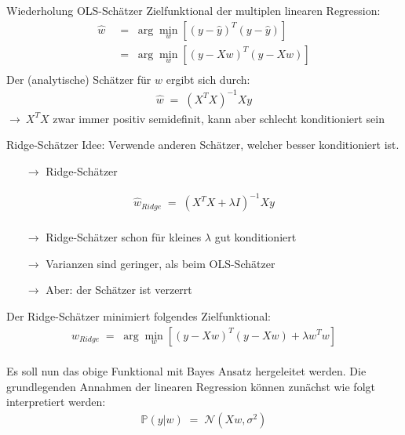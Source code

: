 \documentclass{beamer}
\begin{document}
{\begin{frame}{Wiederholung OLS-Schätzer}
	Zielfunktional der multiplen linearen Regression:
	\begin{align}
		\hat{w}&\;=\;\arg\underset{w}{\min}\left[\left(y-\hat{y}\right)^T\left(y-\hat{y}\right)\right] \\
		&\;=\;\arg\underset{w}{\min}\left[\left(y-Xw\right)^T\left(y-Xw\right)\right]\\
	\end{align}
	Der (analytische) Schätzer für $w$ ergibt sich durch:
	\begin{align}
		\hat{w}\;=\;\left(X^TX\right)^{-1}Xy
	\end{align}
	$\rightarrow\: X^TX$ zwar immer positiv semidefinit, kann aber schlecht konditioniert sein
\end{frame}

\begin{frame}{Ridge-Schätzer}
	Idee: Verwende anderen Schätzer, welcher besser konditioniert ist.
	\begin{itemize}
		\item[$\rightarrow$] Ridge-Schätzer
	\end{itemize}
	\begin{align}
		\hat{w}_{Ridge}\;=\;\left(X^TX+\lambda I\right)^{-1}Xy\\
	\end{align}
	\begin{itemize}
		\item[$\rightarrow$] Ridge-Schätzer schon für kleines $\lambda$ gut konditioniert
		\item[$\rightarrow$] Varianzen sind geringer, als beim OLS-Schätzer
		\item[$\rightarrow$] Aber: der Schätzer ist verzerrt
	\end{itemize}
\end{frame}

\begin{frame}
	Der Ridge-Schätzer minimiert folgendes Zielfunktional:
	\begin{align}
		\hat{w}_{Ridge}\;=\;\arg\underset{w}{\min}\left[\left(y-Xw\right)^T\left(y-Xw\right)+\lambda w^Tw\right]
	\end{align}
	\hfill\\[0,5cm]
	Es soll nun das obige Funktional mit Bayes Ansatz hergeleitet werden. Die grundlegenden Annahmen der linearen Regression können zunächst wie folgt interpretiert werden:
	\begin{align}
		\mathbb{P}(y\vert w)\;=\;\mathcal{N}(Xw,\sigma^2)
	\end{align}
\end{frame}

}
\end{document}
